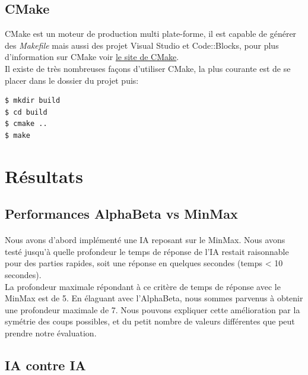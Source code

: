 \documentclass[article, backcover, french, nodocumentinfo]{upmethodology-document}
\begin{document}
		\subsection{CMake}
			CMake est un moteur de production multi plate-forme, il est capable de générer des \textit{Makefile} mais aussi des projet Visual Studio et Code::Blocks, pour plus d'information sur CMake voir \href{https://cmake.org/}{le site de CMake}.\\
				Il existe de très nombreuses façons d'utiliser CMake, la plus courante est de se placer dans le dossier du projet puis:
				\begin{lstlisting}[breaklines=true,breakatwhitespace=true,breakindent=0pt,columns=fixed,keepspaces=true,frame=single,basicstyle=\footnotesize\sffamily]
$ mkdir build
$ cd build
$ cmake ..
$ make \end{lstlisting}
	\section{Résultats}
		\subsection{Performances AlphaBeta vs MinMax}
			\paragraph{}
				Nous avons d'abord implémenté une IA reposant sur le MinMax. Nous avons testé jusqu'à quelle profondeur le temps de réponse de l'IA restait raisonnable pour des parties rapides, soit une réponse en quelques secondes (temps < 10 secondes).\\
				La profondeur maximale répondant à ce critère de temps de réponse avec le MinMax est de 5. En élaguant avec l'AlphaBeta, nous sommes parvenus à obtenir une profondeur maximale de 7. Nous pouvons expliquer cette amélioration par la symétrie des coups possibles, et du petit nombre de valeurs différentes que peut prendre notre évaluation.
		\subsection{IA contre IA}
\end{document}
